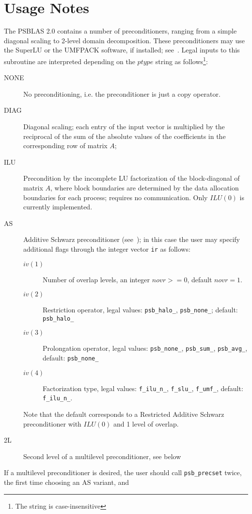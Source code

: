 \section*{Usage Notes}
The PSBLAS 2.0 contains a number of preconditioners, ranging from a
simple diagonal scaling to 2-level domain decomposition. These
preconditioners may use the SuperLU or the UMFPACK software, if
installed; see~\cite{SUPERLU,UMFPACK}. 
Legal inputs to this subroutine are interpreted depending on the
$ptype$ string as follows\footnote{The string is case-insensitive}:
\begin{description}
\item[NONE] No preconditioning, i.e. the preconditioner is just a copy
  operator.
\item[DIAG] Diagonal scaling; each entry of the input vector is
  multiplied by the reciprocal of the sum of the absolute values of
  the coefficients in the corresponding row of matrix  $A$;
\item[ILU] Precondition by the incomplete LU factorization of the
  block-diagonal of matrix $A$, where block boundaries are determined
  by the data allocation boundaries for each process; requires no
  communication. Only $ILU(0)$ is currently implemented. 
\item[AS] Additive Schwarz preconditioner (see~\cite{PARA04}); in this
  case the user may specify additional flags through the integer
  vector \verb|ir| as follows:
\begin{description}
\item[$iv(1)$] Number of overlap levels, an integer $novr>=0$, default
  $novr=1$.  
\item[$iv(2)$] Restriction operator, legal values: \verb|psb_halo_|,
  \verb|psb_none_|; default: \verb|psb_halo_|
\item[$iv(3)$] Prolongation operator, legal values: \verb|psb_none_|,
  \verb|psb_sum_|, \verb|psb_avg_|, default: \verb|psb_none_|
\item[$iv(4)$] Factorization type, legal values: \verb|f_ilu_n_|,
  \verb|f_slu_|, \verb|f_umf_|, default: \verb|f_ilu_n_|.
\end{description}
Note that the default corresponds to a Restricted Additive Schwarz
preconditioner with $ILU(0)$ and 1 level of overlap.
\item[2L] Second level of a multilevel preconditioner, see below
\end{description}
If a multilevel preconditioner is desired, the user should call
\verb|psb_precset| twice, the first time  choosing an AS variant, and
